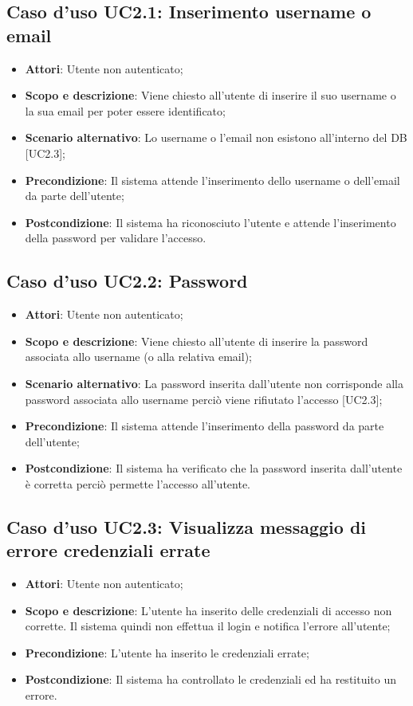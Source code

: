 \documentclass[12pt,a4paper,titlepage]{article}
\begin{document}
	\subsection{Caso d'uso UC2.1: Inserimento username o email}
	\label{UC2.1}
	\begin{itemize}
		\item \textbf{Attori}: Utente non autenticato;
		\item \textbf{Scopo e descrizione}: Viene chiesto all'utente di inserire il suo username o la sua email per poter essere identificato;
		\item \textbf{Scenario alternativo}: Lo username o l'email non esistono all'interno del DB [UC2.3];
		\item \textbf{Precondizione}: Il sistema attende l'inserimento dello username o dell'email da parte dell'utente;
		\item \textbf{Postcondizione}: Il sistema ha riconosciuto l'utente e attende l'inserimento della password per validare l'accesso.
	\end{itemize}
	\subsection{Caso d'uso UC2.2: Password}
	\label{UC2.2}
	\begin{itemize}
		\item \textbf{Attori}: Utente non autenticato;
		\item \textbf{Scopo e descrizione}: Viene chiesto all'utente di inserire la password associata allo username (o alla relativa email);
		\item \textbf{Scenario alternativo}: La password inserita dall'utente non corrisponde alla password associata allo username perciò viene rifiutato l'accesso [UC2.3];
		\item \textbf{Precondizione}: Il sistema attende l'inserimento della password da parte dell'utente;
		\item \textbf{Postcondizione}: Il sistema ha verificato che la password inserita dall'utente è corretta perciò permette l'accesso all'utente.
	\end{itemize}
	\subsection{Caso d'uso UC2.3: Visualizza messaggio di errore credenziali errate}
	\label{UC2.3}
	\begin{itemize}
		\item \textbf{Attori}: Utente non autenticato;
		\item \textbf{Scopo e descrizione}: L'utente ha inserito delle credenziali di accesso non corrette. Il sistema quindi non effettua il login e notifica l'errore all'utente;
		\item \textbf{Precondizione}: L'utente ha inserito le credenziali errate;
		\item \textbf{Postcondizione}: Il sistema ha controllato le credenziali ed ha restituito un errore.
	\end{itemize}
\end{document}
